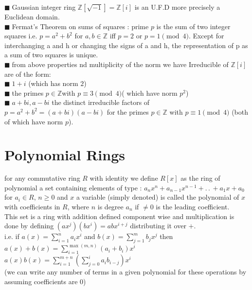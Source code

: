 \documentclass[11pt]{extarticle}
\newcommand{\Z}{\mathbb{Z}}
\newcommand{\ck}{.\,.\,}
\newcommand{\snote}[1]{{\footnotesize(#1)}}
\newcommand{\tbx}[2][]{
	\begin{tcolorbox}[enhanced,breakable,size=small,colback=black!2!white,title={#1},arc is angular, arc=1.5mm,drop fuzzy shadow]
		#2
	\end{tcolorbox}
}
\newcommand{\y}{$\blacksquare\;$}
\begin{document}
\begin{multicols}{2}
{ }
\tbx[Gaussian integer ring]{
	\y Gaussian integer ring $ \Z[\sqrt{-1}]=\Z[i] $ is an U.F.D more precisely a Euclidean domain.\\
\y  Fermat's Theorem on sums of squares :  prime $p $ is the sum of two integer
squares i.e. $ p = a^2 + b^2$ for $ a,b \in \Z$ iff $p = 2 $ or $p = 1 \pmod4$. Except
for interchanging a and h or changing the signs of a and h, the representation
of p as a sum of two squares is unique.\\
\y from above properties nd multiplicity of the norm we have Irreducible of $ \Z[i] $ are of the form:\\
\y $1 + i $ (which has norm $2$)\\
\y the primes $p \in  \Z $with $p \equiv 3 \pmod 4 $\snote{ which have norm $p^2 $}\\
\y  $a +bi , a-bi $ the distinct irreducible factors of $p = a^2 + b^2 =
(a + bi) (a - bi ) $ for the primes $p \in \Z $ with $p \equiv 1 \pmod 4 $ \snote{both of which
have norm $p $}.}

		\section{Polynomial Rings} 

\tbx{for any commutative ring $ R $ with identity we define $ R[x] $ as the ring of polynomial a set containing elements of type :
			$ a_nx^n+a_{n-1}x^{n-1}+\ck +a_1x+a_0 $ for $ a_i\in R $, $ n\geq 0 $ and $ x $ a variable \snote{simply denoted} is called the polynomial of $ x $ with coefficients in $ R $, where  $ n $ is degree $ a_n $ if $ \neq 0 $ is the leading coefficient.\\
			This set is a ring with addition defined component wise and multiplication is done by defining 
			$ (ax^j)(bx^i)=abx^{i+j} $ distributing it over $ + $. \\
			i.e. if $ a(x)=\sum_{i=1}^{n}a_i x^i$ and $ b(x)=\sum_{j=1}^{m} b_j x^j$ then
			$ a(x)+b(x)=\sum_{i=1}^{\max(m,n)}(a_i+b_i)x^i $
			$ a(x)b(x)= \sum_{i=1}^{m+n}(\sum_{j=0}^{i}a_ib_{i-j})x^i$\\
			\snote{we can write any number of terms in a given polynomial for these operations by assuming coefficients are 0}
			} 
		

\end{multicols}
\end{document}
